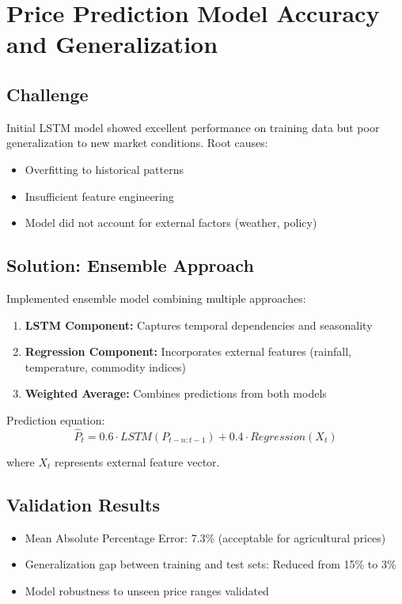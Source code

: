 \documentclass[12pt,a4paper]{report}
\begin{document}
\section{Price Prediction Model Accuracy and Generalization}

\subsection{Challenge}

Initial LSTM model showed excellent performance on training data but poor generalization to new market conditions. Root causes:
\begin{itemize}
    \item Overfitting to historical patterns
    \item Insufficient feature engineering
    \item Model did not account for external factors (weather, policy)
\end{itemize}

\subsection{Solution: Ensemble Approach}

Implemented ensemble model combining multiple approaches:

\begin{enumerate}
    \item \textbf{LSTM Component:} Captures temporal dependencies and seasonality
    \item \textbf{Regression Component:} Incorporates external features (rainfall, temperature, commodity indices)
    \item \textbf{Weighted Average:} Combines predictions from both models
\end{enumerate}

Prediction equation:
$$\hat{P}_t = 0.6 \cdot LSTM(P_{t-n:t-1}) + 0.4 \cdot Regression(X_t)$$

where $X_t$ represents external feature vector.

\subsection{Validation Results}

\begin{itemize}
    \item Mean Absolute Percentage Error: 7.3\% (acceptable for agricultural prices)
    \item Generalization gap between training and test sets: Reduced from 15\% to 3\%
    \item Model robustness to unseen price ranges validated
\end{itemize}
\end{document}
